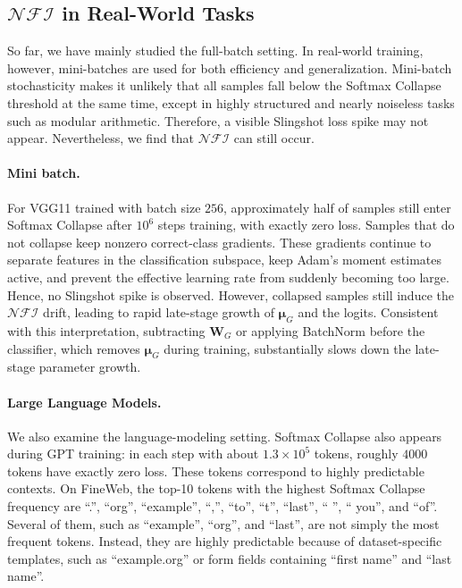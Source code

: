 \documentclass{article}
\theoremstyle{plain}
\theoremstyle{definition}
\theoremstyle{remark}
\begin{document}
\subsection{$\mathcal{NFI}$ in Real-World Tasks}

So far, we have mainly studied the full-batch setting. 
In real-world training, however, mini-batches are used for both efficiency and generalization. 
Mini-batch stochasticity makes it unlikely that all samples fall below the Softmax Collapse threshold at the same time, 
except in highly structured and nearly noiseless tasks such as modular arithmetic. 
Therefore, a visible Slingshot loss spike may not appear. Nevertheless, we find that $\mathcal{NFI}$ can still occur.

\paragraph{Mini batch.}
For VGG11 trained with batch size $256$, 
approximately half of samples still enter Softmax Collapse after $10^6$ steps training, 
with exactly zero loss. Samples that do not collapse keep nonzero correct-class gradients. 
These gradients continue to separate features in the classification subspace, 
keep Adam's moment estimates active, and prevent the effective learning rate from suddenly becoming too large. 
Hence, no Slingshot spike is observed. However, collapsed samples still induce the $\mathcal{NFI}$ drift, 
leading to rapid late-stage growth of $\bm{\mu}_G$ and the logits. 
Consistent with this interpretation, subtracting $\bm{W}_G$ or applying BatchNorm before the classifier, 
which removes $\bm{\mu}_G$ during training, substantially slows down the late-stage parameter growth.

\paragraph{Large Language Models.}
We also examine the language-modeling setting. Softmax Collapse also appears during GPT training: 
in each step with about $1.3 \times 10^5$ tokens, roughly $4000$ tokens have exactly zero loss. 
These tokens correspond to highly predictable contexts. On FineWeb, 
the top-10 tokens with the highest Softmax Collapse frequency are 
``.'', ``org'', ``example'', ``,'', ``to'', ``t'', ``last'', `` '', `` you'', and ``of''. 
Several of them, such as ``example'', ``org'', and ``last'', are not simply the most frequent tokens. 
Instead, they are highly predictable because of dataset-specific templates, 
such as ``example.org'' or form fields containing ``first name'' and ``last name''.
\end{document}
